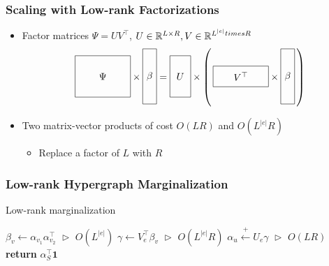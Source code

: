 \documentclass{beamer}
\begin{document}
\begin{frame}
\frametitle{Scaling with Low-rank Factorizations}
\begin{itemize}
\item Factor matrices $\Psi=UV^\top$,
$U\in\mathbb{R}^{L \times R},V\in\mathbb{R}^{L^{|e|}times R}$
\[
\vcenter{\hbox{\begin{tikzpicture}[baseline=-0.5ex]
    \draw (0,0) rectangle (2,1.5) node[pos=.5] {$\Psi$};
\end{tikzpicture}}}
\times
\vcenter{\hbox{\begin{tikzpicture}[baseline=-0.5ex]
    \draw (0,0) rectangle (.5,2) node[pos=.5] {$\beta$};
\end{tikzpicture}}}
=
\vcenter{\hbox{\begin{tikzpicture}[baseline=-0.5ex]
    \draw (0,0) rectangle (.75,1.5) node[pos=.5] {$U$};
\end{tikzpicture}}}
\times
\left(\,
\vcenter{\hbox{\begin{tikzpicture}[baseline=-0.5ex]
    \draw (0,0) rectangle (2,.75) node[pos=.5] {$V^\top$};
\end{tikzpicture}}}
\times
\vcenter{\hbox{\begin{tikzpicture}[baseline=-0.5ex]
    \draw (0,0) rectangle (.5,2) node[pos=.5] {$\beta$};
\end{tikzpicture}}}
\,\right)
\]
\item Two matrix-vector products of cost $O(LR)$ and $O(L^{|e|}R)$
    \begin{itemize}
    \item Replace a factor of $L$ with $R$
    \end{itemize}
\end{itemize}
\end{frame}

\begin{frame}
\frametitle{Low-rank Hypergraph Marginalization}
\centering

\begin{algorithm}[H]
\caption{\label{alg:low-rank-update} Low-rank marginalization}
\begin{algorithmic} 
\STATE $\beta_v \gets \alpha_{v_1}\alpha_{v_2}^\top$
    \hfill $\vartriangleright$ $O(L^{|e|})$
\STATE $\gamma \gets V_e^\top\beta_v$
    \hfill $\vartriangleright$ $O(L^{|e|}R)$
\STATE $\alpha_u \stackrel{+}{\gets} U_e\gamma $
    \hfill $\vartriangleright$ $O(LR)$
\ENDFOR
\STATE \textbf{return} $\alpha_S^\top\mathbf{1}$
\end{algorithmic} 
\end{algorithm}

\end{frame}
\end{document}
